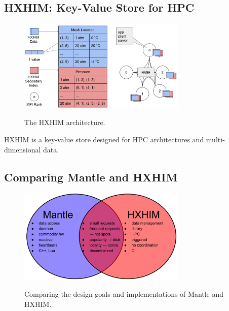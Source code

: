\subsection{HXHIM: Key-Value Store for HPC}
\label{sec:hxhim}

\begin{figure}[tb]
  \noindent\includegraphics[width=19pc,angle=0]{figures/arch-hxhim.png}\\
  \caption{The HXHIM architecture.}
  \label{fig:arch-hxhim}
\end{figure}

HXHIM is a key-value store designed for HPC architectures and multi-dimensional
data. 


\subsection{Comparing Mantle and HXHIM}
\begin{figure}[tb]
  \noindent\includegraphics[width=19pc,angle=0]{figures/arch-comparison.png}\\
  \caption{Comparing the design goals and implementations of Mantle and HXHIM.}
  \label{fig:arch-comparison}
\end{figure}

